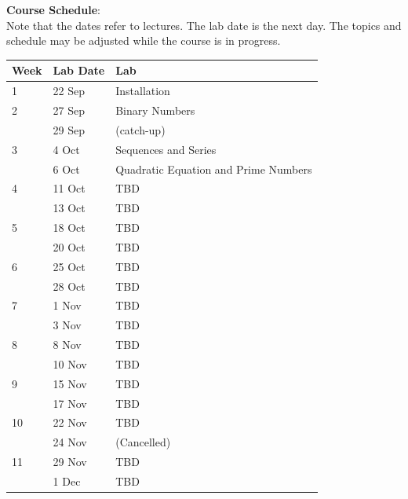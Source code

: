 \documentclass[12pt]{article}
\begin{document}
\newpage


\noindent
\textbf {Course Schedule}:\\
Note that the dates refer to lectures.  The lab date is the next day.
The topics and schedule may be adjusted while the course is in
progress.\\


\begin{table}[h!]
\normalsize %
\begin{tabular}{ lll }
\hline
\textbf{Week} & \textbf{Lab Date} & \textbf{Lab} \\
\hline
1  & 22 Sep & Installation \\
\hline
2  & 27 Sep & Binary Numbers \\
   & 29 Sep & (catch-up)\\
\hline
3  & 4 Oct  & Sequences and Series \\
   & 6 Oct  & Quadratic Equation and Prime Numbers \\
\hline
4  & 11 Oct & TBD \\
   & 13 Oct & TBD \\
\hline
5  & 18 Oct & TBD \\
   & 20 Oct & TBD \\
\hline
6  & 25 Oct & TBD \\
   & 28 Oct & TBD \\
\hline
7  & 1 Nov  & TBD \\
   & 3 Nov  & TBD \\
\hline
8  & 8 Nov  & TBD \\
   & 10 Nov & TBD \\
\hline
9  & 15 Nov & TBD \\
   & 17 Nov & TBD \\
\hline
10 & 22 Nov & TBD \\
   & 24 Nov & (Cancelled)\\
\hline
11 & 29 Nov & TBD \\
   & 1 Dec  & TBD \\
\hline
\end{tabular} 
\end{table}
\end{document}
